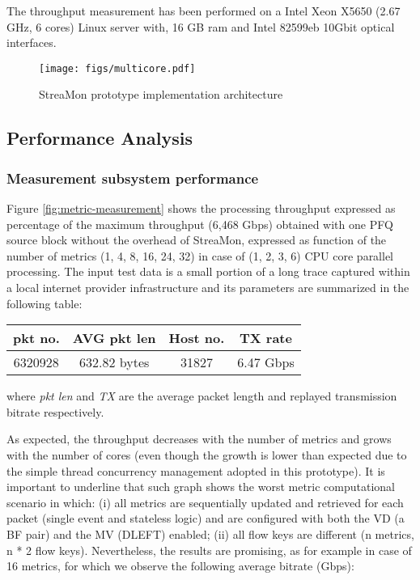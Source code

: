 \documentclass[conference,letterpaper]{sig-alternate-10pt}
\begin{document}
The throughput measurement has been performed on a Intel Xeon X5650 (2.67 GHz, 6 cores) Linux server with, 16 GB ram and Intel 82599eb 10Gbit optical interfaces.

\begin{figure}[!t]
\centering
   \texttt{[image: figs/multicore.pdf]}
\caption{StreaMon prototype implementation architecture}
\label{fig:multicore}
\end{figure}

\subsection{Performance Analysis}
\label{s:perf}
\subsubsection{Measurement subsystem performance} 
Figure \ref{fig:metric-measurement} shows the processing throughput expressed as percentage of the maximum throughput (6,468 Gbps) obtained with one PFQ source block without the overhead of StreaMon, expressed as function of the number of metrics (1, 4, 8, 16, 24, 32) in case of (1, 2, 3, 6) CPU core parallel processing. The input test data is a small portion of a long trace captured within a local internet provider infrastructure and its parameters are summarized in the following table:

\begin{center}
\begin{footnotesize}
\begin{tabular}{ | c | c | c |  c |}
\hline
\textbf{pkt no.} & \textbf{AVG pkt len} & \textbf{Host no.} & \textbf{TX rate}\\
\hline
6320928 & 632.82 bytes & 31827 & 6.47 Gbps \\
\hline
\end{tabular}
\end{footnotesize}
\end{center}

where \textit{pkt len} and \textit{TX} are the average packet length and replayed transmission bitrate respectively. 

As expected, the throughput decreases with the number of metrics and grows with the number of cores (even though the growth is lower than expected due to the simple thread concurrency management adopted in this prototype). It is important to underline that such graph shows the worst metric computational scenario in which: (i) all metrics are sequentially updated and retrieved for each packet (single event and stateless logic) and are configured with both the VD (a BF pair) and the MV (DLEFT) enabled; (ii) all flow keys are different (n metrics, n * 2 flow keys). Nevertheless, the results are promising, as for example in case of 16 metrics, for which we observe the following average bitrate (Gbps):
\end{document}
